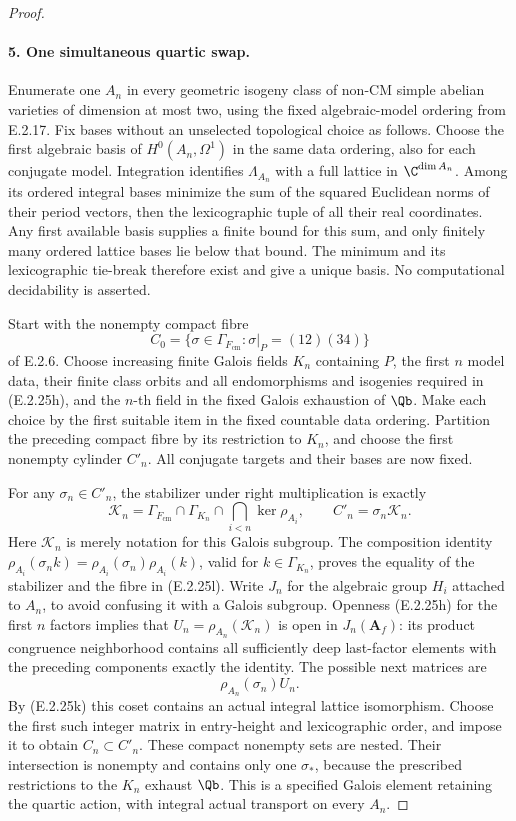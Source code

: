 \begin{proof}
\paragraph{5. One simultaneous quartic swap.}
Enumerate one \(A_n\) in every geometric isogeny
class of non-CM simple abelian varieties of dimension
at most two, using the fixed algebraic-model ordering
from E.2.17. Fix bases without an unselected
topological choice as follows. Choose the first
algebraic basis of \(H^0(A_n,\Omega^1)\) in the
same data ordering, also for each conjugate model.
Integration identifies \(\Lambda_{A_n}\) with a
full lattice in \(\C^{\dim A_n}\). Among its
ordered integral bases minimize the sum of the
squared Euclidean norms of their period vectors,
then the lexicographic tuple of all their real
coordinates. Any first available basis supplies
a finite bound for this sum, and only finitely
many ordered lattice bases lie below that bound.
The minimum and its lexicographic tie-break
therefore exist and give a unique basis. No computational
decidability is asserted.

Start with the nonempty compact fibre
\[
 C_0=\{\sigma\in\Gamma_{F_{\mathrm{cm}}}:
                         \sigma|_P=(12)(34)\}
\]
of E.2.6. Choose increasing finite Galois fields
\(K_n\) containing \(P\), the first \(n\) model
data, their finite class orbits and all endomorphisms
and isogenies required in (E.2.25h), and the \(n\)-th
field in the fixed Galois exhaustion of \(\Qb\).
Make each choice by the first suitable item in the
fixed countable data ordering. Partition the
preceding compact fibre by its restriction to
\(K_n\), and choose the first nonempty cylinder
\(C'_n\). All conjugate targets and their bases
are now fixed.

For any \(\sigma_n\in C'_n\), the stabilizer under
right multiplication is exactly
\[
 \mathcal K_n=\Gamma_{F_{\mathrm{cm}}}\cap\Gamma_{K_n}
                   \cap\bigcap_{i<n}\ker\rho_{A_i},
 \qquad C'_n=\sigma_n\mathcal K_n.
 \tag{E.2.25l}
\]
Here \(\mathcal K_n\) is merely notation for this
Galois subgroup. The composition identity
\(\rho_{A_i}(\sigma_n k)
=\rho_{A_i}(\sigma_n)\rho_{A_i}(k)\), valid for
\(k\in\Gamma_{K_n}\), proves the equality of
the stabilizer and the fibre in (E.2.25l).
Write \(J_n\) for the algebraic group \(H_i\)
attached to \(A_n\), to avoid confusing it with
a Galois subgroup. Openness (E.2.25h) for the first
\(n\) factors implies that
\(U_n=\rho_{A_n}(\mathcal K_n)\) is open in
\(J_n(\mathbf A_f)\): its product congruence
neighborhood contains all sufficiently deep
last-factor elements with the preceding components
exactly the identity. The possible next matrices are
\[
 \rho_{A_n}(\sigma_n)U_n.
 \tag{E.2.25m}
\]
By (E.2.25k) this coset contains an actual integral
lattice isomorphism. Choose the first such integer
matrix in entry-height and lexicographic order,
and impose it to obtain \(C_n\subset C'_n\).
These compact nonempty sets are nested. Their
intersection is nonempty and contains only one
\(\sigma_*\), because the prescribed restrictions
to the \(K_n\) exhaust \(\Qb\). This is a
specified Galois element retaining the quartic
action, with integral actual transport on every
\(A_n\).


\end{proof}
